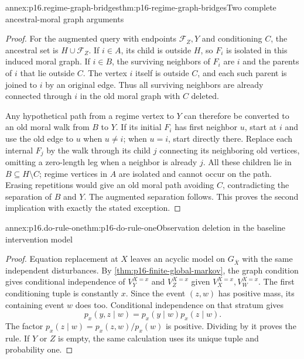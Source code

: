 \begin{annexitem}{annex:p16.regime-graph-bridges}{thm:p16-regime-graph-bridges}{Two complete ancestral-moral graph arguments}
\begin{proof}
For the augmented query with endpoints \(\mathcal F_Z,Y\) and
conditioning \(C\), the ancestral set is \(H\cup\mathcal F_Z\).
If \(i\in A\), its child is outside \(H\), so \(F_i\)
is isolated in this induced moral graph. If \(i\in B\), the
surviving neighbors of \(F_i\) are \(i\) and the parents of
\(i\) that lie outside \(C\). The vertex \(i\) itself is
outside \(C\), and each such parent is joined to \(i\) by
an original edge. Thus all surviving neighbors are already connected
through \(i\) in the old moral graph with \(C\) deleted.

Any hypothetical path from a regime vertex to \(Y\) can therefore
be converted to an old moral walk from \(B\) to \(Y\). If its
initial \(F_i\) has first neighbor \(u\), start at \(i\) and
use the old edge to \(u\) when \(u\ne i\); when \(u=i\),
start directly there. Replace each internal \(F_j\) by the walk
through its child \(j\) connecting its neighboring old vertices,
omitting a zero-length leg when a neighbor is already \(j\).
All these children lie in
\(B\subseteq H\setminus C\); regime vertices in \(A\) are
isolated and cannot occur on the path. Erasing repetitions would give
an old moral path avoiding \(C\), contradicting the separation
of \(B\) and \(Y\). The augmented separation follows. This
proves the second implication with exactly the stated exception.
\end{proof}
\end{annexitem}

\begin{annexitem}{annex:p16.do-rule-one}{thm:p16-do-rule-one}{Observation deletion in the baseline intervention model}
\begin{proof}
Equation replacement at \(X\) leaves an acyclic model on
\(G_{\overline X}\) with the same independent disturbances.
By \cref{thm:p16-finite-global-markov}, the graph condition gives
conditional independence of \(V_Y^{X=x}\) and \(V_Z^{X=x}\)
given \(V_X^{X=x},V_W^{X=x}\). The first conditioning tuple
is constantly \(x\). Since the event \((z,w)\) has positive
mass, its containing event \(w\) does too. Conditional independence
on that stratum gives
\[
 p_x(y,z\mid w)=p_x(y\mid w)p_x(z\mid w).
\]
The factor \(p_x(z\mid w)=p_x(z,w)/p_x(w)\) is positive.
Dividing by it proves the rule. If \(Y\) or \(Z\) is empty,
the same calculation uses its unique tuple and probability one.
\end{proof}
\end{annexitem}

